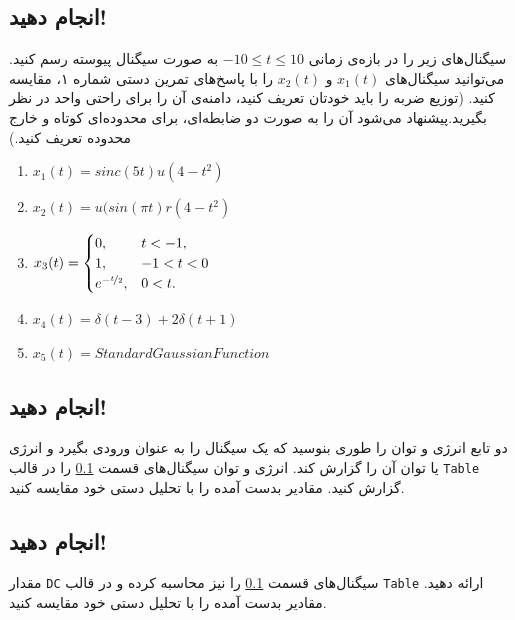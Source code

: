 \documentclass{utsignal}
\begin{document}
	\subsection{انجام دهید!} \label{ssec:signals}
	سیگنال‌های زیر را در بازه‌ی زمانی $-10 \le t \le 10$ به صورت سیگنال پیوسته رسم کنید. می‌توانید سیگنال‌های $x_1(t)$ و $x_2(t)$ را با پاسخ‌های تمرین دستی شماره ۱، مقایسه کنید. (توزیع ضربه را باید خودتان تعریف کنید، دامنه‌ی آن را برای راحتی واحد در نظر بگیرید.پیشنهاد می‌شود آن را به صورت دو ضابطه‌ای، برای محدوده‌ای کوتاه و خارج محدوده تعریف کنید.)
	\begin{latin}
		\begin{flushleft}
			\begin{enumerate}
				\item $x_1(t) = sinc(5t) u(4-t^2)$
				\item $x_2(t) = u(sin(\pi t) r(4-t^2)$
				\item $x_3(t) = \begin{cases}
									0, & t < -1,\\
									1, & -1 < t < 0\\
									e^{-\nicefrac{t}{2}}, & 0 < t.
								\end{cases}$
				\item $x_4(t) = \delta(t-3) + 2\delta(t+1)$
				\item $x_5(t) = Standard Gaussian Function$
			\end{enumerate}
		\end{flushleft}
	\end{latin}

	\subsection{انجام دهید!}
	دو تابع انرژی و توان را طوری بنوسید که یک سیگنال را به عنوان ورودی بگیرد و انرژی یا توان آن را گزارش کند. انرژی و توان سیگنال‌های قسمت \ref{ssec:signals} را در قالب \lstinline{Table} گزارش کنید. مقادیر بدست آمده را با تحلیل دستی خود مقایسه کنید.
	\subsection{انجام دهید!}
	مقدار \lstinline{DC} سیگنال‌های قسمت \ref{ssec:signals} را نیز محاسبه کرده و در قالب \lstinline{Table}  ارائه دهید. مقادیر بدست آمده را با تحلیل دستی خود مقایسه کنید.
\end{document}
